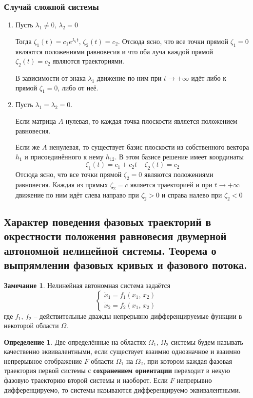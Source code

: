 \documentclass[a4paper,12pt]{article}
\theoremstyle{plain}
\theoremstyle{definition}
\newtheorem{definition}{Определение}[section]
\newtheorem*{note}{Замечание}
\theoremstyle{remark}
\begin{document}
\subsubsection*{Случай сложной системы}
\begin{enumerate}
	\item Пусть $\lambda_1 \neq 0,\, \lambda_2 = 0$

	      Тогда $\zeta_1(t) = c_1e^{\lambda_1 t},\, \zeta_2(t) = c_2$. Отсюда ясно, что все точки прямой $\zeta_1 = 0$ являются положениями равновесия и что оба луча каждой прямой $\zeta_2(t) = c_2$ являются траекториями.

	      В зависимости от знака $\lambda_1$ движение по ним при $t \to +\infty$ идёт либо к прямой $\zeta_1 = 0$, либо от неё.
	\item Пусть $\lambda_1 = \lambda_2 = 0$.

	      Если матрица $A$ нулевая, то каждая точка плоскости является положением равновесия.

	      Если же $A$ ненулевая, то существует базис плоскости из собственного вектора $h_1$ и присоединённого к нему $h_{12}$. В этом базисе решение имеет координаты
	      \[\zeta_1(t) = c_1 + c_2t\;\;\;\; \zeta_2(t) = c_2\]
	      Отсюда ясно, что все точки прямой $\zeta_2 = 0$ являются положениями равновесия. Каждая из прямых $\zeta_2 = c$ является траекторией и при $t \to +\infty$ движение по ним идёт слева направо при $\zeta_2 > 0$ и справа налево при $\zeta_2 < 0$
\end{enumerate}

\subsection{Характер поведения фазовых траекторий в окрестности положения равновесия двумерной автономной нелинейной системы. Теорема о выпрямлении фазовых кривых и фазового потока.}
\begin{note}
	Нелинейная автономная система задаётся
	\[\begin{cases}
			\dot{x}_1 = f_1(x_1,\,x_2) \\
			\dot{x}_2 = f_2(x_1,\,x_2)
		\end{cases}\]
	где $f_1,\,f_2$ -- действительные дважды непрерывно дифференцируемые функции в некоторой области $\Omega$.
\end{note}

\begin{definition}
	Две определённые на областях $\Omega_1,\, \Omega_2$ системы будем называть качественно эквивалентными, если существует взаимно однозначное и взаимно непрерывное отображение $F$ области $\Omega_1$ на $\Omega_2$, при котором каждая фазовая траектория первой системы с \textbf{сохранением ориентации} переходит в некую фазовую траекторию второй системы и наоборот. Если $F$ непрерывно дифференцируемо, то системы называются дифференцируемо эквивалентными.
\end{definition}
\end{document}
